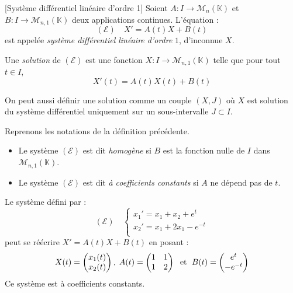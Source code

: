 \documentclass[a4paper,10pt]{report}
\begin{document}
\begin{Definition}{}[Système différentiel linéaire d'ordre 1] Soient $A : I \rightarrow \mathcal{M}_n(\mathbb{K})$ et $B : I \rightarrow \mathcal{M}_{n,1}(\mathbb{K})$ deux applications continues. L'équation :
$$ (\mathcal{E}) \quad X'=A(t)X+B(t)$$
est appelée \emph{système différentiel linéaire d'ordre} $1$, d'inconnue $X$.

Une \emph{solution} de $(\mathcal{E})$ est une fonction $X : I \rightarrow \mathcal{M}_{n,1}(\mathbb{K})$ telle que pour tout $t \in I$,
$$ X'(t) = A(t) X(t) + B(t)$$
\end{Definition}

\begin{Remarque}{}
On peut aussi définir une solution comme un couple $(X,J)$ où $X$ est solution du système différentiel uniquement sur un sous-intervalle $J \subset I$.
\end{Remarque}

\begin{Definition}{} Reprenons les notations de la définition précédente.

\begin{itemize}
\item Le système $(\mathcal{E})$ est dit \emph{homogène} si $B$ est la fonction nulle de $I$ dans $\mathcal{M}_{n,1}(\mathbb{K})$.
\item Le système $(\mathcal{E})$ est dit \emph{à coefficients constants} si $A$ ne dépend pas de $t$.
\end{itemize}
\end{Definition}

\begin{Exemple} Le système défini par :
$$ (\mathcal{E}) \quad \left\lbrace \begin{array}{lcl}
x_1'=x_1+x_2 + e^t \\
x_2'=x_1+2x_1 - e^{-t} \\
\end{array}\right.$$
peut se réécrire $X'=A(t)X+B(t)$ en posant :
$$ X(t) = \begin{pmatrix}
x_1(t) \\
x_2(t) \\
\end{pmatrix}, \; A(t) = \begin{pmatrix}
1 & 1 \\
1 & 2 \\
\end{pmatrix} \; \hbox{ et } \; B(t) = \begin{pmatrix}
e^t \\
-e^{-t} \\
\end{pmatrix}$$
Ce système est à coefficients constants.
\end{Exemple}
\end{document}
